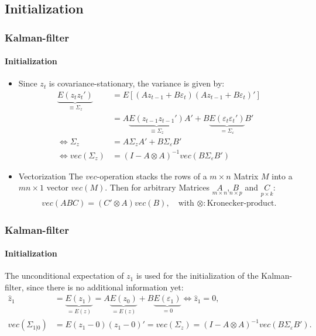 \documentclass[handout]{beamer}  %
\begin{document}
\subsection{Initialization}
\begin{frame}\frametitle{Kalman-filter}\framesubtitle{Initialization}
  \begin{itemize}
    \item Since ${z_t}$ is covariance-stationary, the variance is given by:
\begin{align*}
    \underbrace{E({z_t} {z_t}')}_{\equiv {\Sigma_z}}&=E\left[({A} {z_{t-1}} + {B} {\varepsilon_t})({A} {z_{t-1}} + {B} {\varepsilon_t})'\right] \\
    &= {A} \underbrace{E({z_{t-1}}{z_{t-1}}')}_{\equiv {\Sigma_z}}{A}' + {B} \underbrace{E({\varepsilon_t} {\varepsilon_t}')}_{={\Sigma_\varepsilon}} {B}'\\
\Leftrightarrow {\Sigma_z} &= {A} {\Sigma_z} {A'} + {B} {\Sigma_\varepsilon} {B}'\\
\Leftrightarrow    vec({\Sigma_z}) &= ({I}-{A} \otimes {A})^{-1} vec({B} {\Sigma_\varepsilon} {B}')
\end{align*}
\item \begin{block}{Vectorization}
    The $vec$-operation stacks the rows of a $m\times n$ Matrix ${M}$ into a $mn\times 1$ vector $vec({M})$. Then for arbitrary Matrices $\underset{m\times n}{A}$,$\underset{n\times p}{B}$ and $\underset{p \times k}{C}$:
    \begin{align*}
        vec(ABC) = (C' \otimes A)vec(B), \quad \text{with } \otimes: \text{Kronecker-product.}
    \end{align*}
\end{block}
  \end{itemize}
\end{frame}

\begin{frame}\frametitle{Kalman-filter}\framesubtitle{Initialization}
The unconditional expectation of ${z_1}$ is used for the initialization of the Kalman-filter, since there is no additional information yet:
\begin{align*}
{\widehat{z}_1} &= \underbrace{E({z_1})}_{=E({z})} = {A }\underbrace{E({z_0})}_{=E({z})} + {B}\underbrace{E({\varepsilon_1})}_{=0} \Leftrightarrow {\widehat{z}_1} = {0},\\
vec({\Sigma_{1|0}}) & = E({z_1}-{0})({z_1}-{0})'= vec({\Sigma_z}) = ({I}-{A} \otimes {A})^{-1} vec({B} {\Sigma_\varepsilon} {B}').
\end{align*}

\end{frame}
\end{document}
